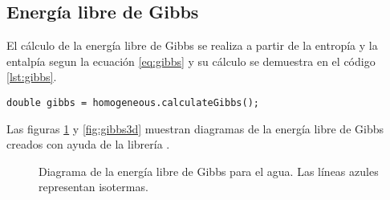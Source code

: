 \subsection{Energía libre de Gibbs}
	
	El cálculo de la energía libre de Gibbs se realiza a partir de la entropía y la entalpía segun la ecuación \ref{eq:gibbs} y su cálculo se demuestra en el código \ref{lst:gibbs}.

	\begin{lstlisting}[label={lst:gibbs},caption={Cálculo de la energía libre de Gibbs con la librería \Materia}]
		double gibbs = homogeneous.calculateGibbs();
	\end{lstlisting}

	Las figuras \ref{fig:2dgibbs} y \ref{fig:gibbs3d} muestran diagramas de la energía libre de Gibbs creados con ayuda de la librería \Materia.

\begin{figure}[!h]
	\centering	
	\caption{Diagrama de la energía libre de Gibbs para el agua. Las líneas azules representan isotermas.}\label{fig:2dgibbs}
\end{figure}

